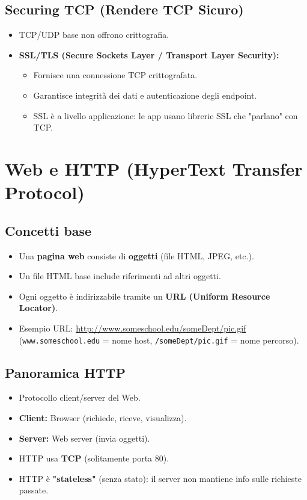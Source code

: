 \documentclass{article}
\begin{document}
\subsection{Securing TCP (Rendere TCP Sicuro)}
\begin{itemize}
    \item TCP/UDP base non offrono crittografia.
    \item \textbf{SSL/TLS (Secure Sockets Layer / Transport Layer Security):}
    \begin{itemize}
        \item Fornisce una connessione TCP crittografata.
        \item Garantisce integrità dei dati e autenticazione degli endpoint.
        \item SSL è a livello applicazione: le app usano librerie SSL che "parlano" con TCP.
    \end{itemize}
\end{itemize}

\section{Web e HTTP (HyperText Transfer Protocol)}
\subsection{Concetti base}
\begin{itemize}
    \item Una \textbf{pagina web} consiste di \textbf{oggetti} (file HTML, JPEG, etc.).
    \item Un file HTML base include riferimenti ad altri oggetti.
    \item Ogni oggetto è indirizzabile tramite un \textbf{URL (Uniform Resource Locator)}.
    \item Esempio URL: \url{http://www.someschool.edu/someDept/pic.gif}
    (\texttt{www.someschool.edu} = nome host, \texttt{/someDept/pic.gif} = nome percorso).
\end{itemize}

\subsection{Panoramica HTTP}
\begin{itemize}
    \item Protocollo client/server del Web.
    \item \textbf{Client:} Browser (richiede, riceve, visualizza).
    \item \textbf{Server:} Web server (invia oggetti).
    \item HTTP usa \textbf{TCP} (solitamente porta 80).
    \item HTTP è \textbf{"stateless"} (senza stato): il server non mantiene info sulle richieste passate.
\end{itemize}
\end{document}
